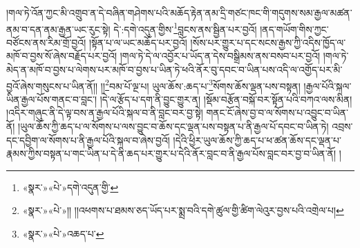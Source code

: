 །གལ་ཏེ་འོན་ཀྱང་མི་འགྲུབ་ན་དེ་བཞིན་གཤེགས་པའི་མཆོད་རྟེན་ནམ་དྲི་གཙང་ཁང་གི་གདུགས་སམ་རྒྱལ་མཚན་ནམ་བ་དན་ནམ་རྒྱན་ཡང་རུང་སྟེ། དེ་:དགེ་འདུན་གྱིས་\footnote{«སྣར་»«པེ་»དགེ་འདུན་གྱི་}བླངས་ནས་སྦྱིན་པར་བྱའོ། །ནད་གཡོག་གིས་ཀྱང་བཙོངས་ནས་རིམ་གྲོ་བྱའོ། །སྟོན་པ་ལ་ཡང་མཆོད་པར་བྱའོ། །སོས་པར་གྱུར་པ་དང་སངས་རྒྱས་ཀྱི་འདིས་ཁྱོད་ལ་མཁོ་བ་བྱས་སོ་ཞེས་བརྗོད་པར་བྱའོ། །གལ་ཏེ་དེ་ལ་འབྱོར་པ་ཡོད་ན་དེས་བསྒྲིམས་ནས་བསབ་པར་བྱའོ། །གལ་ཏེ་མེད་ན་མཁོ་བ་བྱས་པ་ལེགས་པར་མཁོ་བ་བྱས་པ་ཡིན་ཏེ་ཕའི་ནོར་བུ་དབང་བ་ཡིན་པས་འདི་ལ་འགྱོད་པར་མི་བྱའོ་ཞེས་གསུངས་པ་ཡིན་ནོ།། །།\footnote{«སྣར་»«པེ་»།། །།འཕགས་པ་ཐམས་ཅད་ཡོད་པར་སྨྲ་བའི་དགེ་ཚུལ་གྱི་ཚིག་ལེའུར་བྱས་པའི་འགྲེལ་པ། }བམ་པོ་ལྔ་པ། ཡུལ་ཆོས་:ཆད་པ་\footnote{«སྣར་»«པེ་»འཆད་པ་}སོགས་ཆོས་ལྡན་པས་བསྟན། །རྒྱལ་པོའི་སྐལ་ཡིན་རྒྱལ་པོས་གནང་བ་བླང་། །དེ་ལ་རྩོད་པ་དག་ནི་བྱུང་གྱུར་ན། །སྡོམ་བརྩོན་བསྐོ་བར་སྟོན་པའི་བཀའ་ལས་མིན། །འདིར་གཞུང་ནི་དེ་ལྟ་བས་ན་རྒྱལ་པོའི་སྐལ་བ་ནི་བླང་བར་བྱ་སྟེ། གནང་ངོ་ཞེས་བྱ་བ་ལ་སོགས་པ་འབྱུང་བ་ཡིན་ནོ། །ཡུལ་ཆོས་ཀྱི་ཆད་པ་ལ་སོགས་པ་ལས་བྱུང་བ་ཆོས་དང་ལྡན་པས་བསྟན་པ་ནི་རྒྱལ་པོ་དབང་བ་ཡིན་ཏེ། འབྲས་དང་དབྱིག་ལ་སོགས་པ་ནི་རྒྱལ་པོའི་སྐལ་བ་ཞེས་བྱའོ། །དེའི་ཕྱིར་ཡུལ་ཆོས་ཀྱི་ཆད་པ་ཕ་ཚན་ཆོས་དང་ལྡན་པ་རྣམས་ཀྱིས་བསྟན་པ་གང་ཡིན་པ་དེ་ནི་ཆད་པར་གྱུར་པ་དེའི་ནོར་བླང་བ་ནི་རྒྱལ་པོས་བླང་བར་བྱ་བ་ཡིན་ནོ། །
